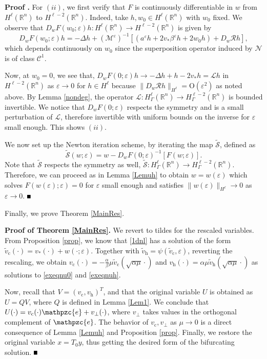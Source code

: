 \documentclass[10pt]{article}
\newenvironment{Proof}[1][\unskip]%
 {\begin{trivlist} \item[]{\bf Proof #1. }}%
 {\hspace*{\fill}$\rule{.4\baselineskip}{.4\baselineskip}$\end{trivlist}}
\newcommand{\R}{\mathbb{R}}
\newcommand{\rmO}{\mathrm{O}}
\newcommand{\eps}{\varepsilon}
\newcommand{\Nl}{\mathcal{N}}
\newcommand{\cS}{\mathcal{S}}
\newcommand{\cL}{\mathcal{L}}
\newcommand{\e}{\mathpzc{e}}
\newcommand{\M}{\mathcal{M}}
\newcommand{\Rm}{\mathcal{R}}
\begin{document}
\begin{Proof}
For $(ii)$, we first verify that $F$ is continuously differentiable in $w$ from $H^\ell (\R^n)$ to $H^{\ell-2}(\R^n)$. Indeed, take $h, w_0\in H^\ell(\R^n)$ with $w_0$ fixed. We observe that $D_wF(w_0;\eps)h:H^\ell (\R^n) \to H^{\ell-2}(\R^n)$ is given by
\[
D_wF(w_0;\eps)h = -\Delta h+(\M^\eps)^{-1}\left[(a^\eps h+2v_*\beta^\eps h + 2w_0h)+D_w\Rm h\right],
\]
which depends continuously on $w_0$ since the superposition operator induced by $\Nl$ is of class $\mathscr{C}^1$.

Now, at $w_0 = 0$, we see that, $D_wF(0;\eps)h \to -\Delta h+h-2v_*h = \cL h$ in $H^{\ell-2}(\R^n)$ as $\eps \to 0$ for $h \in H^\ell$ because $\|D_w\Rm h\|_{H^\ell} = \rmO(\eps^2)$ as noted above. By Lemma \ref{nondeg}, the operator $\cL : H^\ell_{\Gamma}(\R^n) \to H^{\ell-2}_{\Gamma}(\R^n)$ is bounded invertible. We notice that $D_wF(0;\eps)$ respects the symmetry and is a small perturbation of $\cL$, therefore invertible with uniform bounds on the inverse for $\eps$ small enough. This shows $(ii)$.

We now set up the Newton iteration scheme, by iterating the map  $\tilde{\cS}$, defined as
\[
\tilde{\cS}(w;\eps) = w-D_wF(0;\eps)^{-1}[F(w;\eps)]
.\]
Note that $\tilde{\cS}$ respects the symmetry as well, $\tilde{\cS} : H^\ell_\Gamma(\R^n) \to H^{\ell-2}_\Gamma(\R^n)$. Therefore, we can proceed as in Lemma \ref{Lemuh} to obtain $w=w(\eps)$ which solves $F(w(\eps);\eps) = 0$ for $\eps $ small enough and satisfies $\|w(\eps)\|_{H^\ell} \to 0$ as $\eps \to 0$.
\end{Proof}

Finally, we prove Theorem \ref{MainRes}.
\begin{Proof}[of Theorem \ref{MainRes}] We revert to tildes for the rescaled variables. From Proposition \ref{prop}, we know that \eqref{1dnl} has a solution of the form $\tilde{v}_\mathrm{c}(\cdot) = v_*(\cdot)+w(\cdot;\eps)$. Together with $\tilde{v}_\mathrm{h} = \psi(\tilde{v}_\mathrm{c},\eps)$, reverting the rescaling, we obtain $v_\mathrm{c}(\cdot) = -\frac{\alpha}{\beta}\mu \tilde{v}_\mathrm{c}(\sqrt{\alpha\mu }\cdot)$ and $v_\mathrm{h}(\cdot) = \alpha\mu \tilde{v}_\mathrm{h}(\sqrt{\alpha\mu}\cdot)$ as solutions to \eqref{exeqnu0} and \eqref{exeqnuh}.

Now, recall that $V=(v_\mathrm{c},v_\mathrm{h})^T$, and that the original variable $U$ is obtained as $U= QV$, where $Q$ is defined in Lemma \ref{Lem1}. We conclude that $U(\cdot)=v_\mathrm{c}(\cdot){\e}+v_{\perp}(\cdot)$, where $v_{\perp}$ takes values in the orthogonal complement of ${\e}$. The behavior of $v_\mathrm{c},v_{\perp}$ as $\mu \to 0$ is a direct consequence of Lemma \ref{Lemuh} and Proposition \ref{prop}. Finally, we restore the original variable $x = T_0y$, thus getting the desired form of the bifurcating solution.
\end{Proof}
\end{document}
